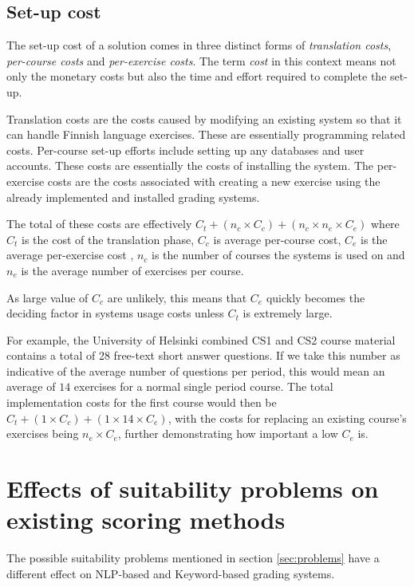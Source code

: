 \documentclass[english]{tktltiki2}
\theoremstyle{definition}
\theoremstyle{remark}
\begin{document}
\subsection{Set-up cost}
\label{sec:set-up-cost}

The set-up cost of a solution comes in three distinct forms of \emph{translation costs}, \emph{per-course costs} and \emph{per-exercise costs}. The term \emph{cost} in this context means not only the monetary costs but also the time and effort required to complete the set-up.

Translation costs are the costs caused by modifying an existing system so that it can handle Finnish language exercises. These are essentially programming related costs. Per-course set-up efforts include setting up any databases and user accounts. These costs are essentially the costs of installing the system. The per-exercise costs are the costs associated with creating a new exercise using the already implemented and installed grading systems. 

The total of these costs are effectively $C_t + (n_c \times C_c) + (n_c \times n_e \times C_e)$ where $C_t$ is the cost of the translation phase, $C_c$ is average per-course cost, $C_e$ is the average per-exercise cost , $n_c$ is the number of courses the systems is used on and $n_e$ is the average number of exercises per course.

As large value of $C_c$ are unlikely, this means that $C_e$ quickly becomes the deciding factor in systems usage costs unless $C_t$ is extremely large. 

For example, the University of Helsinki combined CS1 and CS2 course material \cite{vihavainen14} contains a total of 28 free-text short answer questions. If we take this number as indicative of the average number of questions per period, this would mean an average of $14$ exercises for a normal single period course. The total implementation costs for the first course would then be $C_t + (1 \times C_c) + (1 \times 14 \times C_e)$, with the costs for replacing an existing course's exercises being $n_e \times C_e$, further demonstrating how important a low $C_e$ is.

\section{Effects of suitability problems on existing scoring methods}

The possible suitability problems mentioned in section \ref{sec:problems} have a different effect on NLP-based and Keyword-based grading systems.
\end{document}
